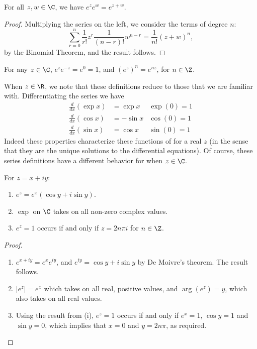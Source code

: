 \documentclass[a4]{scrartcl}
\begin{document}
\begin{proposition}
	For all $z, w \in \C$, we have $e^z e^w = e^{z + w}.$
\end{proposition}
\begin{proof}[Proof]
	Multiplying the series on the left, we consider the terms of degree $n$:
	$$
	\sum_{r=0}^{n} \frac{1}{r !} z^{r} \frac{1}{(n-r) !} w^{n-r}=\frac{1}{n !}(z+w)^{n},
	$$
	by the Binomial Theorem, and the result follows.
\end{proof}

\begin{corollary}
	For any $z \in \C$, $e^z e^{-z} = e^0 = 1$, and $(e^{z})^n = e^{nz}$, for $n \in \Z$.
\end{corollary}

When $z \in \R$, we note that these definitions reduce to those that we are familiar with. Differentiating the series we have
\begin{align*}
\frac{d}{dx}(\exp x) &= \exp x  & \exp(0) = 1\\
\frac{d}{dx}(\cos x) &= -\sin x  & \cos(0) = 1\\
\frac{d}{dx}(\sin x) &= \cos x  & \sin(0) = 1
\end{align*}
Indeed these properties characterize these functions of for a real $z$ (in the sense that they are the unique solutions to the differential equations).
Of course, these series definitions have a different behavior for when $z \in \C$.

\begin{lemma}\label{lemma:properties-of-exp}
	For $z = x + iy$:
	\begin{enumerate}[label=(\roman*)]
		\item $e^z = e^x ( \cos y + i \sin y)$.
		\item $\exp$ on $\C$ takes on all non-zero complex values.
		\item $e^z = 1$ occurs if and only if $z = 2 n \pi i$ for $n \in \Z$. 
	\end{enumerate}
\end{lemma}
\begin{proof}$ $ \phantom{\qedhere}
	\begin{enumerate}[label=(\roman*)]
		\item $e^{x + iy} = e^{x} e^{iy}$, and $e^{iy} = \cos y + i \sin y$ by De Moivre's theorem. The result follows.
		\item $|e^z| = e^x$ which takes on all real, positive values, and $\arg(e^z) = y$, which also takes on all real values.
		\item Using the result from (i), $e^{z} = 1$ occurs if and only if $e^x = 1$, $\cos y = 1$ and $\sin y = 0$, which implies that $x = 0$ and $y = 2 n \pi$, as required. 
 	\end{enumerate}
\end{proof}
\end{document}
